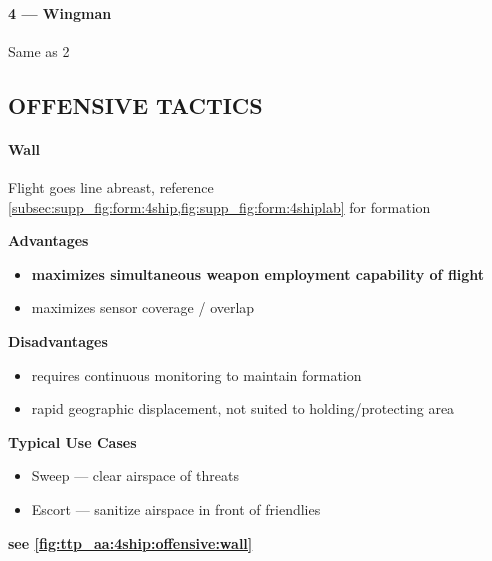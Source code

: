 \paragraph{4 --- Wingman}
Same as 2


\clearpage

\subsection{OFFENSIVE TACTICS}

\paragraph{Wall}
Flight goes line abreast, 
reference \cref{subsec:supp_fig:form:4ship,fig:supp_fig:form:4shiplab}
for formation

\bigskip
\textbf{Advantages}
\begin{itemize}
    \item \textbf{maximizes simultaneous weapon employment capability of flight}
    \item maximizes sensor coverage / overlap
\end{itemize}

\textbf{Disadvantages}
\begin{itemize}
    \item requires continuous monitoring to maintain formation
    \item rapid geographic displacement, 
    not suited to holding/protecting area
\end{itemize}

\textbf{Typical Use Cases}
\begin{itemize}
    \item Sweep --- clear airspace of threats
    \item Escort --- sanitize airspace in front of friendlies
\end{itemize}
\hfill\textbf{see \cref{fig:ttp_aa:4ship:offensive:wall}}

